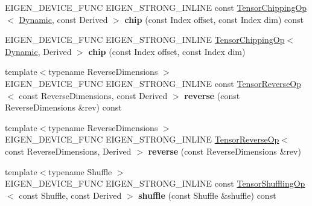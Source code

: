\begin{DoxyCompactItemize}
\mbox{\label{class_eigen_1_1_tensor_base_a6f84df0f9fa6b6e14b03da2822f42639}} 
E\+I\+G\+E\+N\+\_\+\+D\+E\+V\+I\+C\+E\+\_\+\+F\+U\+NC E\+I\+G\+E\+N\+\_\+\+S\+T\+R\+O\+N\+G\+\_\+\+I\+N\+L\+I\+NE const \hyperlink{class_eigen_1_1_tensor_chipping_op}{Tensor\+Chipping\+Op}$<$ \hyperlink{namespace_eigen_ad81fa7195215a0ce30017dfac309f0b2}{Dynamic}, const Derived $>$ {\bfseries chip} (const Index offset, const Index dim) const
\item 
\mbox{\label{class_eigen_1_1_tensor_base_a5b7439137451f37c26f9f40ae4b3f201}} 
E\+I\+G\+E\+N\+\_\+\+D\+E\+V\+I\+C\+E\+\_\+\+F\+U\+NC E\+I\+G\+E\+N\+\_\+\+S\+T\+R\+O\+N\+G\+\_\+\+I\+N\+L\+I\+NE \hyperlink{class_eigen_1_1_tensor_chipping_op}{Tensor\+Chipping\+Op}$<$ \hyperlink{namespace_eigen_ad81fa7195215a0ce30017dfac309f0b2}{Dynamic}, Derived $>$ {\bfseries chip} (const Index offset, const Index dim)
\item 
\mbox{\label{class_eigen_1_1_tensor_base_a5750e1b817c004898c1b54101c84e419}} 
{\footnotesize template$<$typename Reverse\+Dimensions $>$ }\\E\+I\+G\+E\+N\+\_\+\+D\+E\+V\+I\+C\+E\+\_\+\+F\+U\+NC E\+I\+G\+E\+N\+\_\+\+S\+T\+R\+O\+N\+G\+\_\+\+I\+N\+L\+I\+NE const \hyperlink{class_eigen_1_1_tensor_reverse_op}{Tensor\+Reverse\+Op}$<$ const Reverse\+Dimensions, const Derived $>$ {\bfseries reverse} (const Reverse\+Dimensions \&rev) const
\item 
\mbox{\label{class_eigen_1_1_tensor_base_af728216c82e1b396c5c1f22855733368}} 
{\footnotesize template$<$typename Reverse\+Dimensions $>$ }\\E\+I\+G\+E\+N\+\_\+\+D\+E\+V\+I\+C\+E\+\_\+\+F\+U\+NC E\+I\+G\+E\+N\+\_\+\+S\+T\+R\+O\+N\+G\+\_\+\+I\+N\+L\+I\+NE \hyperlink{class_eigen_1_1_tensor_reverse_op}{Tensor\+Reverse\+Op}$<$ const Reverse\+Dimensions, Derived $>$ {\bfseries reverse} (const Reverse\+Dimensions \&rev)
\item 
\mbox{\label{class_eigen_1_1_tensor_base_a8d6f38be695d3f72a6106463c10fc50e}} 
{\footnotesize template$<$typename Shuffle $>$ }\\E\+I\+G\+E\+N\+\_\+\+D\+E\+V\+I\+C\+E\+\_\+\+F\+U\+NC E\+I\+G\+E\+N\+\_\+\+S\+T\+R\+O\+N\+G\+\_\+\+I\+N\+L\+I\+NE const \hyperlink{class_eigen_1_1_tensor_shuffling_op}{Tensor\+Shuffling\+Op}$<$ const Shuffle, const Derived $>$ {\bfseries shuffle} (const Shuffle \&shuffle) const

\end{DoxyCompactItemize}
